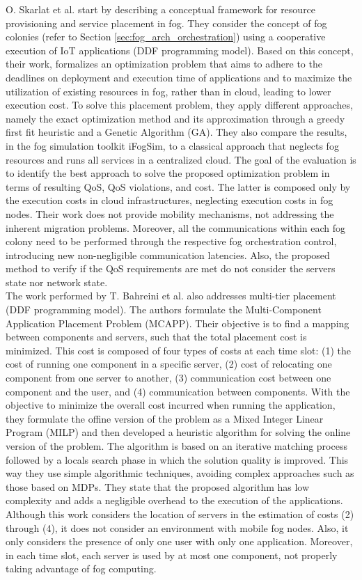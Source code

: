 \noindent\tab O. Skarlat et al. \cite{skarlat2017optimized} start by describing a conceptual framework for resource provisioning and service placement in fog. They consider the concept of fog colonies (refer to Section \ref{sec:fog_arch_orchestration}) using a cooperative execution of IoT applications (DDF programming model). Based on this concept, their work, formalizes an optimization problem that aims to adhere to the deadlines on deployment and execution time of applications and to maximize the utilization of existing resources in fog, rather than in cloud, leading to lower execution cost. To solve this placement problem, they apply different approaches, namely the exact optimization method and its approximation through a greedy first fit heuristic and a Genetic Algorithm (GA). They also compare the results, in the fog simulation toolkit iFogSim, to a classical approach that neglects fog resources and runs all services in a centralized cloud. The goal of the evaluation is to identify the best approach to solve the proposed optimization problem in terms of resulting QoS, QoS violations, and cost. The latter is composed only by the execution costs in cloud infrastructures, neglecting execution costs in fog nodes. Their work does not provide mobility mechanisms, not addressing the inherent migration problems. Moreover, all the communications within each fog colony need to be performed through the respective fog orchestration control, introducing new non-negligible communication latencies. Also, the proposed method to verify if the QoS requirements are met do not consider the servers state nor network state.\\
\noindent\tab The work performed by T. Bahreini et al. \cite{bahreini2017efficient} also addresses multi-tier placement (DDF programming model). The authors formulate the Multi-Component Application Placement Problem (MCAPP). Their objective is to find a mapping between components and servers, such that the total placement cost is minimized. This cost is composed of four types of costs at each time slot: (1) the cost of running one component in a specific server, (2) cost of relocating one component from one server to another, (3) communication cost between one component and the user, and (4) communication between components. With the objective to minimize the overall cost incurred when running the application, they formulate the offine version of the problem as a Mixed Integer Linear Program (MILP) and then developed a heuristic algorithm for solving the online version of the problem. The algorithm is based on an iterative matching process followed by a locals search phase in which the solution quality is improved. This way they use simple algorithmic techniques, avoiding complex approaches such as those based on MDPs. They state that the proposed algorithm has low complexity and adds a negligible overhead to the execution of the applications. Although this work considers the location of servers in the estimation of costs (2) through (4), it does not consider an environment with mobile fog nodes. Also, it only considers the presence of only one user with only one application. Moreover, in each time slot, each server is used by at most one component, not properly taking advantage of fog computing.\\
